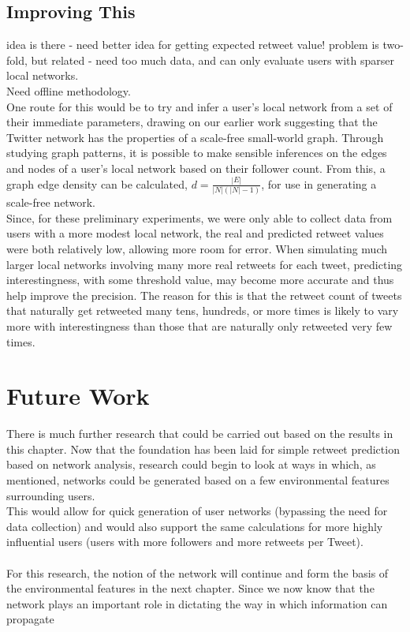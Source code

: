 \subsection{Improving This}
idea is there - need better idea for getting expected retweet value! problem is two-fold, but related - need too much data, and can only evaluate users with sparser local networks.
\\
Need offline methodology.
\\
One route for this would be to try and infer a user's local network from a set of their immediate parameters, drawing on our earlier work suggesting that the Twitter network has the properties of a scale-free small-world graph. Through studying graph patterns, it is possible to make sensible inferences on the edges and nodes of a user's local network based on their follower count. From this, a graph edge density can be calculated, $ d = \frac{|E|}{|N|(|N|-1)} $, for use in generating a scale-free network.
\\
Since, for these preliminary experiments, we were only able to collect data from users with a more modest local network, the real and predicted retweet values were both relatively low, allowing more room for error. When simulating much larger local networks involving many more real retweets for each tweet, predicting interestingness, with some threshold value, may become more accurate and thus help improve the precision. The reason for this is that the retweet count of tweets that naturally get retweeted many tens, hundreds, or more times is likely to vary more with interestingness than those that are naturally only retweeted very few times.

\section{Future Work}
There is much further research that could be carried out based on the results in this chapter. Now that the foundation has been laid for simple retweet prediction based on network analysis, research could begin to look at ways in which, as mentioned, networks could be generated based on a few environmental features surrounding users.
\\
This would allow for quick generation of user networks (bypassing the need for data collection) and would also support the same calculations for more highly influential users (users with more followers and more retweets per Tweet).
\\ \\
For this research, the notion of the network will continue and form the basis of the environmental features in the next chapter. Since we now know that the network plays an important role in dictating the way in which information can propagate


